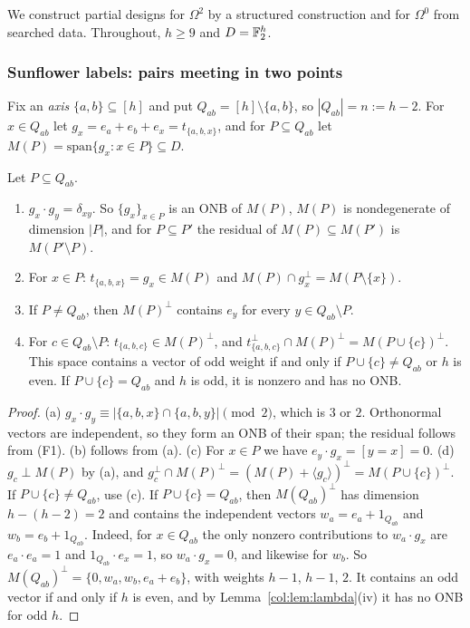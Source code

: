 We construct partial designs for $\Omega^2$ by a structured construction and for $\Omega^0$ from
searched data. Throughout, $h\ge9$ and $D=\mathbb{F}_2^h$.

\subsubsection*{Sunflower labels: pairs meeting in two points}

Fix an \emph{axis} $\{a,b\}\subseteq[h]$ and put $Q_{ab}=[h]\setminus\{a,b\}$, so $|Q_{ab}|=n:=h-2$. For
$x\in Q_{ab}$ let $g_x=e_a+e_b+e_x=t_{\{a,b,x\}}$, and for $P\subseteq Q_{ab}$ let
$M(P)=\mathrm{span}\{g_x:x\in P\}\subseteq D$.

\begin{lemma}\label{col:lem:sunlabels}
Let $P\subseteq Q_{ab}$.
\begin{enumerate}
\item[(a)] $g_x\cdot g_y=\delta_{xy}$. So $\{g_x\}_{x\in P}$ is an ONB of $M(P)$, $M(P)$ is nondegenerate
  of dimension $|P|$, and for $P\subseteq P'$ the residual of $M(P)\subseteq M(P')$ is $M(P'\setminus P)$.
\item[(b)] For $x\in P$: $t_{\{a,b,x\}}=g_x\in M(P)$ and $M(P)\cap g_x^\perp=M(P\setminus\{x\})$.
\item[(c)] If $P\ne Q_{ab}$, then $M(P)^\perp$ contains $e_y$ for every $y\in Q_{ab}\setminus P$.
\item[(d)] For $c\in Q_{ab}\setminus P$: $t_{\{a,b,c\}}\in M(P)^\perp$, and
  $t_{\{a,b,c\}}^\perp\cap M(P)^\perp=M(P\cup\{c\})^\perp$. This space contains a vector of odd weight if
  and only if $P\cup\{c\}\ne Q_{ab}$ or $h$ is even. If $P\cup\{c\}=Q_{ab}$ and $h$ is odd, it is nonzero and has
  no ONB.
\end{enumerate}
\end{lemma}

\begin{proof}
(a) $g_x\cdot g_y\equiv|\{a,b,x\}\cap\{a,b,y\}|\pmod 2$, which is $3$ or $2$. Orthonormal vectors are
independent, so they form an ONB of their span; the residual follows from (F1). (b) follows from (a).
(c) For $x\in P$ we have $e_y\cdot g_x=[y=x]=0$. (d) $g_c\perp M(P)$ by (a), and
$g_c^\perp\cap M(P)^\perp=(M(P)+\langle g_c\rangle)^\perp=M(P\cup\{c\})^\perp$. If $P\cup\{c\}\ne Q_{ab}$, use
(c). If $P\cup\{c\}=Q_{ab}$, then $M(Q_{ab})^\perp$ has dimension $h-(h-2)=2$ and contains the
independent vectors $w_a=e_a+1_{Q_{ab}}$ and $w_b=e_b+1_{Q_{ab}}$. Indeed, for $x\in Q_{ab}$ the only
nonzero contributions to $w_a\cdot g_x$ are $e_a\cdot e_a=1$ and $1_{Q_{ab}}\cdot e_x=1$, so
$w_a\cdot g_x=0$, and likewise for $w_b$. So
$M(Q_{ab})^\perp=\{0,w_a,w_b,e_a+e_b\}$, with weights $h-1$, $h-1$, $2$. It contains an odd vector if and
only if $h$ is even, and by Lemma~\ref{col:lem:lambda}(iv) it has no ONB for odd $h$.
\end{proof}


